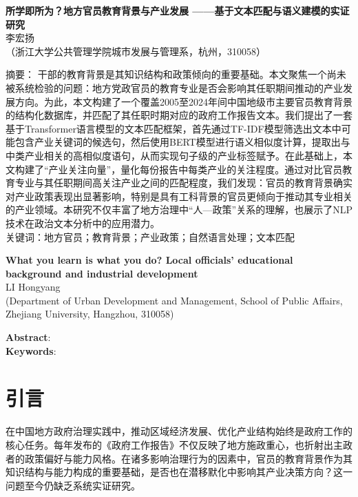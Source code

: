 \documentclass[a4paper,11pt, fontset=fandol]{ctexart}
\newcommand*{\TNR}{\CJKfamily{TNR}}
\newcommand{\sanhao}{\fontsize{15.75pt}{\baselineskip}\selectfont}
\newcommand{\sihao}{\fontsize{14pt}{\baselineskip}\selectfont}
\newcommand{\wuhao}{\fontsize{10.5pt}{\baselineskip}\selectfont}
\begin{document}
\begin{center}
\textbf{\sanhao 所学即所为？地方官员教育背景与产业发展 ——基于文本匹配与语义建模的实证研究} \\
\kaishu \wuhao 李宏扬 \\
\songti （浙江大学公共管理学院城市发展与管理系，杭州，310058）\\
\end{center}
\heiti \noindent 摘要： \songti 干部的教育背景是其知识结构和政策倾向的重要基础。本文聚焦一个尚未被系统检验的问题：地方党政官员的教育专业是否会影响其任职期间推动的产业发展方向。为此，本文构建了一个覆盖2005至2024年间中国地级市主要官员教育背景的结构化数据库，并匹配了其任职时期对应的政府工作报告文本。我们提出了一套基于Transformer语言模型的文本匹配框架，首先通过TF-IDF模型筛选出文本中可能包含产业关键词的候选句，然后使用BERT模型进行语义相似度计算，提取出与中类产业相关的高相似度语句，从而实现句子级的产业标签赋予。在此基础上，本文构建了“产业关注向量”，量化每份报告中每类产业的关注程度。通过对比官员教育专业与其任职期间高关注产业之间的匹配程度，我们发现：官员的教育背景确实对产业政策表现出显著影响，特别是具有工科背景的官员更倾向于推动其专业相关的产业领域。本研究不仅丰富了地方治理中“人—政策”关系的理解，也展示了NLP技术在政治文本分析中的应用潜力。\\
\heiti \noindent 关键词：\songti 地方官员；教育背景；产业政策；自然语言处理；文本匹配


\begin{center}
\textbf{\TNR\sihao What you learn is what you do? Local officials' educational background and industrial development} \\
\wuhao LI Hongyang \\
(Department of Urban Development and Management, School of Public Affairs, Zhejiang University, Hangzhou, 310058) 
\end{center}
\noindent \textbf{Abstract}: \\
\noindent \textbf{Keywords}: 

\newpage
\tableofcontents
\newpage
\songti

\section{引言}
在中国地方政府治理实践中，推动区域经济发展、优化产业结构始终是政府工作的核心任务。每年发布的《政府工作报告》不仅反映了地方施政重心，也折射出主政者的政策偏好与能力风格。在诸多影响治理行为的因素中，官员的教育背景作为其知识结构与能力构成的重要基础，是否也在潜移默化中影响其产业决策方向？这一问题至今仍缺乏系统实证研究。
\end{document}
